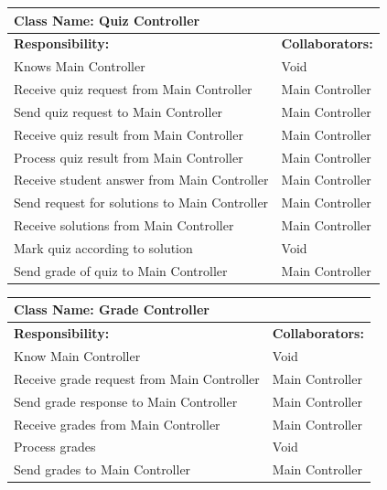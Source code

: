 \documentclass[]{article}
\begin{document}
	\begin{table}[H]
	\centering
		\begin{tabular}{|p{9cm}|p{3cm}|}
		\hline
		 \multicolumn{2}{|l|}{\textbf{Class Name: Quiz Controller}} \\
		\hline
		\textbf{Responsibility:} & \textbf{Collaborators:} \\
		\hline
		Knows Main Controller & Void\\
		\hline
		Receive quiz request from Main Controller & Main Controller \\
		\hline
		Send quiz request to Main Controller & Main Controller \\
		\hline
		Receive quiz result from Main Controller & Main Controller \\
		\hline
		Process quiz result from Main Controller & Main Controller \\
		\hline
		Receive student answer from Main Controller & Main Controller \\
		\hline
		Send request for solutions to Main Controller & Main Controller \\
		\hline
		Receive solutions from Main Controller & Main Controller \\
		\hline
		Mark quiz according to solution & Void\\
		\hline
		Send grade of quiz to Main Controller & Main Controller \\
		\hline

		\end{tabular}
	\end{table}


	\begin{table}[H]
	\centering
		\begin{tabular}{|p{9cm}|p{3cm}|}
		\hline
		 \multicolumn{2}{|l|}{\textbf{Class Name: Grade Controller}} \\
		\hline
		\textbf{Responsibility:} & \textbf{Collaborators:} \\
		\hline
		Know Main Controller & Void \\
		\hline
		Receive grade request from Main Controller & Main Controller \\
		\hline
		Send grade response to Main Controller & Main Controller \\
		\hline
		Receive grades from Main Controller & Main Controller \\
		\hline
		Process grades & Void\\
		\hline
		Send grades to Main Controller & Main Controller \\
		\hline
		\end{tabular}
	\end{table}
	
\end{document}
